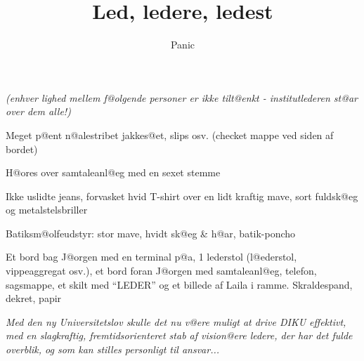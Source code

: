 \documentclass[a4paper,11pt]{article}
\title{Led, ledere, ledest}
\author{Panic}
\begin{document}
\maketitle

{\large \em (enhver lighed mellem f@olgende personer er ikke tilt@enkt
- institutlederen st@ar over dem alle!)}

\begin{roles}

 Meget p@ent n@alestribet jakkes@et,
slips osv. (checket mappe ved siden af bordet)

 H@ores over samtaleanl@eg med en
sexet stemme

 Ikke uslidte jeans, forvasket hvid
T-shirt over en lidt kraftig mave, sort fuldsk@eg og
metalstelsbriller

 Batiksm@olfeudstyr: stor mave, hvidt
sk@eg \& h@ar, batik-poncho

 Et bord bag J@orgen med en terminal p@a, 1
lederstol (l@ederstol, vippeaggregat osv.), et bord foran J@orgen med
samtaleanl@eg, telefon, sagsmappe, et skilt med ``LEDER'' og et
billede af Laila i ramme. Skraldespand, dekret, papir

\end{roles}

{\sl Med den ny Universitetslov skulle det nu v@ere muligt at drive DIKU
effektivt, med en slagkraftig, fremtidsorienteret stab af vision@ere
ledere, der har det fulde overblik, og som kan stilles personligt til
ansvar...}
\end{document}
